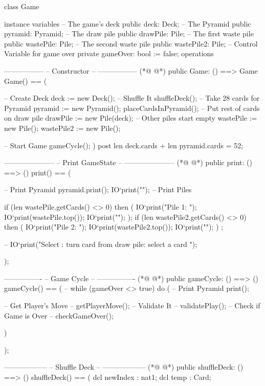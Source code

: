 \begin{vdmpp}[breaklines=true]
class Game

instance variables
 -- The game's deck
 public deck: Deck;
 -- The Pyramid
 public pyramid: Pyramid;
 -- The draw pile
 public drawPile: Pile;
 -- The first waste pile
 public wastePile: Pile;
 -- The second waste pile
 public wastePile2: Pile;
 -- Control Variable for game over
 private gameOver: bool := false;
operations

 -----------------
 -- Constructor --
 -----------------
(*@
\label{Game:21}
@*)
 public Game: () ==> Game
 Game() == 
 ( 

  -- Create Deck
  deck := new Deck();
  -- Shuffle It  
  shuffleDeck();
  -- Take 28 cards for Pyramid  
  pyramid := new Pyramid();
  placeCardsInPyramid();
  -- Put rest of cards on draw pile
  drawPile := new Pile(deck);
  -- Other piles start empty
  wastePile  := new Pile();
  wastePile2 := new Pile();

  
  -- Start Game
  gameCycle();
 )
 post len deck.cards + len pyramid.cards = 52;
 
 ---------------------
 -- Print GameState --
 ---------------------
(*@
\label{print:47}
@*)
 public print: () ==> ()
 print() == 
 (

  -- Print Pyramid 
  pyramid.print();
  IO`print("\n");
  -- Print Piles
  
  if (len wastePile.getCards() <> 0) then 
  (
   IO`print("Pile 1: ");
   IO`print(wastePile.top());
   IO`print("\n");
  );
  if (len wastePile2.getCards() <> 0) then 
  (
   IO`print("Pile 2: ");
   IO`print(wastePile2.top());
   IO`print("\n");
  ) ;
  
--  IO`print("Select : turn card from draw pile: select a card \n");
 
 );
 
 ----------------
 -- Game Cycle --
 ----------------
(*@
\label{gameCycle:76}
@*)
 public gameCycle: () ==> ()
 gameCycle() == 
 (
 -- while (gameOver <> true) do 
  (
   -- Print Pyramid
   print();
   
   -- Get Player's Move
   -- getPlayerMove();
   -- Validate It
   -- validatePlay();
   -- Check if Game is Over
   -- checkGameOver();
  
  )
 
 );
 
 
 
 ------------------
 -- Shuffle Deck --
 ------------------
(*@
\label{shuffleDeck:100}
@*)
 public shuffleDeck: () ==> ()
 shuffleDeck() == 
 (
   dcl newIndex : nat1;
     dcl temp : Card;
     

\end{vdmpp}
